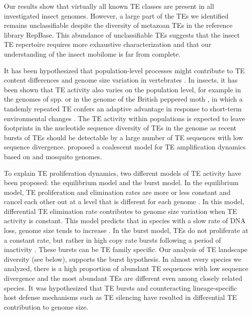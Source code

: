 Our results show that virtually all known TE classes are present in all
investigated insect genomes.  However, a large part of the TEs we
identified remains unclassifiable despite the diversity of metazoan TEs
in the reference library RepBase.  This abundance of unclassifiable TEs
suggests that the insect TE repertoire requires more exhaustive
characterization and that our understanding of the insect mobilome is
far from complete.

It has been hypothesized that population-level processes might
contribute to TE content differences and genome size variation in
vertebrates \citep{Lynch2003}. In insects, it has been shown that TE
activity also varies on the population level, for example in the genomes
of  spp. \citep{Perrat2013,Li2013,Blumenstiel2013}
or in the genome of the British peppered moth , in which a tandemly repeated TE confers an adaptive
advantage in response to short-term environmental changes
\citep{Hof2016}. The TE activity within populations is expected to leave
footprints in the nucleotide sequence diversity of TEs in the genome as
recent bursts of TEs should be detectable by a large number of TE
sequences with low sequence divergence. \citet{Struchiner2009} proposed
a coalescent model for TE amplification dynamics based on
 and  mosquito genomes.



To explain TE proliferation dynamics, two different models of TE
activity have been proposed: the equilibrium model and the burst model.
In the equilibrium model, TE proliferation and elimination rates are
more or less constant and cancel each other out at a level that is
different for each genome \citep{Charlesworth1983}. In this model,
differential TE elimination rate contributes to genome size variation
when TE activity is constant. This model predicts that in species with a
slow rate of DNA loss, genome size tends to increase
\citep{Petrov2011,Sun2011}.  In the burst model, TEs do not proliferate
at a constant rate, but rather in high copy rate bursts following a
period of inactivity \citep{Blumenstiel2013}. These bursts can be TE
family specific. Our analysis of TE landscape diversity (see below),
supports the burst hypothesis. In almost every species we analyzed,
there is a high proportion of abundant TE sequences with low sequence
divergence and the most abundant TEs are different even among closely
related species. It was hypothesized that TE bursts and counteracting
lineage-specific host defense mechanisms such as TE silencing
\citep{LeRouzic2006} have resulted in differential TE contribution to
genome size.

